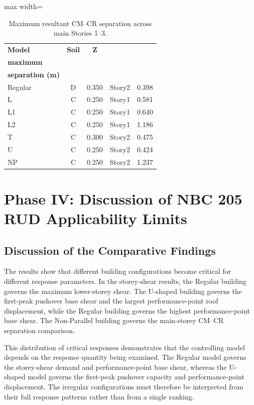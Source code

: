 \begin{table}[!htbp]
\caption{Maximum resultant CM--CR separation across main Stories 1--3.}
\label{tab:ch4_cmcr_summary}
\centering
\footnotesize
\setlength{\tabcolsep}{3pt}
\begin{adjustbox}{max width=\linewidth}
\begin{tabular}{@{}l c c c r@{}}
\toprule
\textbf{Model} & \textbf{Soil} & \textbf{Z} & \shortstack{\textbf{Storey at}\\\textbf{maximum}} & \shortstack{\textbf{Maximum resultant}\\\textbf{separation (m)}}\\
\midrule
Regular & D & 0.350 & Story2 & 0.398\\
L & C & 0.250 & Story1 & 0.581\\
L1 & C & 0.250 & Story1 & 0.640\\
L2 & C & 0.250 & Story1 & 1.186\\
T & C & 0.300 & Story2 & 0.475\\
U & C & 0.250 & Story2 & 0.424\\
NP & C & 0.250 & Story2 & 1.237\\
\bottomrule
\end{tabular}
\end{adjustbox}
\end{table}




\section{Phase IV: Discussion of NBC 205 RUD Applicability Limits}
\subsection{Discussion of the Comparative Findings}
The results show that different building configurations become critical for different response parameters. In the storey-shear results, the Regular building governs the maximum lower-storey shear. The U-shaped building governs the first-peak pushover base shear and the largest performance-\allowbreak{}point roof displacement, while the Regular building governs the highest performance-\allowbreak{}point base shear. The Non-Parallel building governs the main-storey CM--CR separation comparison.

This distribution of critical responses demonstrates that the controlling model depends on the response quantity being examined. The Regular model governs the storey-shear demand and performance-\allowbreak{}point base shear, whereas the U-shaped model governs the first-peak pushover capacity and performance-\allowbreak{}point displacement. The irregular configurations must therefore be interpreted from their full response patterns rather than from a single ranking.

